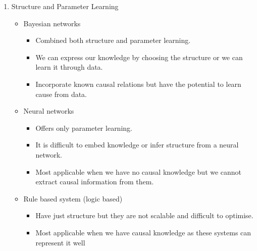\documentclass[12pt,twoside]{article}
\begin{document}
\begin{enumerate}
\item Structure and Parameter Learning
	\begin{itemize}
		\item Bayesian networks 
			\begin{itemize}
				\item Combined both structure and parameter learning. 
				\item We can express our knowledge by choosing the structure or we can learn it through data.
				\item Incorporate known causal relations but have the potential to learn cause from data.
			\end{itemize}
		\item Neural networks
			\begin{itemize}		
		 		\item Offers only parameter learning. 
		 		\item It is difficult to embed knowledge or infer structure from a neural network.
		 		\item Most applicable when we have no causal knowledge but we cannot extract causal information from them.
		 	\end{itemize}
		\item Rule based system (logic based)
			\begin{itemize}
				\item Have just structure but they are not scalable and difficult to optimise.
				\item Most applicable when we have causal knowledge as these systems can represent it well
			\end{itemize}
	\end{itemize}


\end{enumerate}

\newpage
\end{document}
